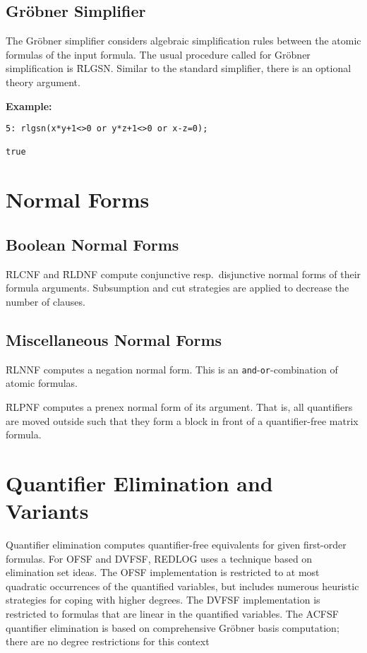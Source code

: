 \subsection{Gr\"obner Simplifier}
The Gr\"obner simplifier considers algebraic simplification rules
between the atomic formulas of the input formula. The usual procedure
called for Gr\"obner simplification is \f{RLGSN}.
Similar to the standard simplifier, there is an optional theory
argument.

\begin{samepage}
\vspace{0.5cm}
{\bf Example:}
\begin{verbatim}
5: rlgsn(x*y+1<>0 or y*z+1<>0 or x-z=0);

true
\end{verbatim}
\end{samepage}

\section{Normal Forms}

\subsection{Boolean Normal Forms}
\f{RLCNF} and \f{RLDNF} compute conjunctive
resp.~disjunctive normal forms of their formula arguments. Subsumption
and cut strategies are applied to decrease the number of clauses.

\subsection{Miscellaneous Normal Forms}
\f{RLNNF} computes a 
negation normal form. This is an {\tt and}-\texttt{or}-combination of
atomic formulas.

\f{RLPNF} computes a prenex normal form of its
argument. That is, all quantifiers are moved outside such that they
form a block in front of a quantifier-free matrix formula.

\section{Quantifier Elimination and Variants}
Quantifier elimination computes quantifier-free equivalents for given
first-order formulas. For \textsc{OFSF} and \textsc{DVFSF}, REDLOG
uses a technique based on elimination set ideas. The \textsc{OFSF}
implementation is restricted to at most quadratic occurrences of the
quantified variables, but includes numerous heuristic strategies for
coping with higher degrees. The \textsc{DVFSF} implementation is
restricted to formulas that are linear in the quantified variables.
The \textsc{ACFSF} quantifier elimination is based on comprehensive
Gr\"obner basis computation; there are no degree restrictions for this
context

